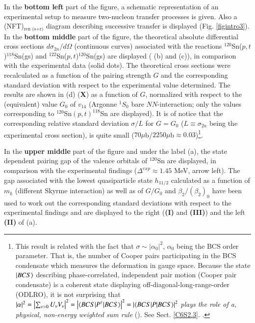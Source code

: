   In the \textbf{bottom left} part of the figure, a schematic representation of an experimental setup to measure   two-nucleon transfer processes is given. Also a (NFT)$_{\text{ren (s+r)}}$ diagram describing  successive transfer is displayed (Fig. \ref{figintro3}). In the \textbf{bottom middle} part of the figure, the theoretical absolute differential cross sections $d\sigma_{2n}/d\Omega$ (continuous curves) associated with the reactions $^{120}$Sn($p,t$)$^{118}$Sn(gs) and $^{122}$Sn($p,t$)$^{120}$Sn(gs) are displayed ( (b) and (c)), in comparison with the experimental data (solid dots). The theoretical cross sections were recalculated as a function of the pairing strength $G$ and the corresponding standard deviation with respect to the experimental value determined. The results are shown in (d) (\textbf{X}) as a function of $G$, normalized with respect to the (equivalent) value $G_0$ of $v_{14}$ (Argonne $^1S_0$ bare $NN$-interaction; only the values corresponding to $^{120}$Sn$(p,t)^{118}$Sn are displayed). It is of notice that the corresponding relative standard deviation $\sigma/L$ for $G=G_0$  ($L\equiv\sigma_{2n}$ being the experimental cross section),  is quite small ($70\mu$b/$2250\mu$b$\approx0.03$)\footnote{This result is related with the fact that $\sigma\sim|\alpha_0|^2$, $\alpha_0$ being the BCS order parameter. That is, the number of Cooper pairs 
  	 participating in the BCS condensate which measures the deformation in gauge space. Because the state $|{BCS} \rangle$ describing phase-correlated, independent pair motion (Cooper pair condensate) is a coherent state displaying off-diagonal-long-range-order 
  	 (ODLRO), it is not surprising that $|\alpha|^2=\left|\sum_{\nu>0}U_\nu V_\nu\right|^2=\left|\langle {BCS|P^\dagger|BCS} \rangle\right|^2=\left|\langle {BCS|P|BCS} \rangle\right|^2$ \textit{plays the role of a, physical, non-energy weighted sum rule}  (\cite{Potel:17}). See Sect. \ref{C6S2.3}.  .}.
  
  
  
  In the  \textbf{upper middle} part of the figure and under the label  (a), the state dependent pairing gap of the  valence orbitals of $^{120}$Sn are displayed, in comparison with the experimental findings ($\Delta^{exp}\approx1.45$ MeV, arrow left). The gap associated with the lowest quasiparticle state $h_{11/2}$ calculated as a function of $m_k$ (different Skyrme interaction) as well as of $G/G_0$ and $\beta_2/(\beta_2)_0$ have been used to work out the corresponding   standard deviations with respect to the experimental findings and are displayed to the right (\textbf{(I)} and \textbf{(III)}) and the left \textbf{(II)}  of (a).
  
